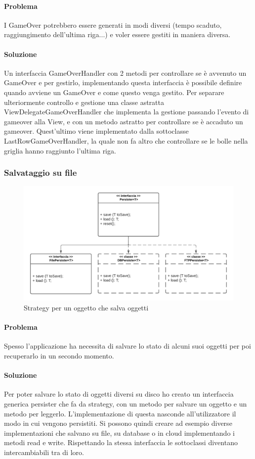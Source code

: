 \documentclass[a4paper,12pt]{report}
\begin{document}
\paragraph{Problema} I GameOver potrebbero essere generati in modi diversi (tempo scaduto, raggiungimento dell'ultima riga...) e voler essere gestiti in maniera diversa.

\paragraph{Soluzione} Un interfaccia GameOverHandler con 2 metodi per controllare se è avvenuto un GameOver e per gestirlo, implementando questa interfaccia è possibile definire quando avviene un GameOver
e come questo venga gestito. Per separare ulteriormente controllo e gestione una classe astratta ViewDelegateGameOverHandler che implementa la gestione passando l'evento di gameover alla View, e con un metodo
astratto per controllare se è accaduto un gameover. Quest'ultimo viene implementato dalla sottoclasse LastRowGameOverHandler, la quale non fa altro che controllare se le bolle nella griglia hanno raggiunto l'ultima
riga.

\subsubsection{Salvataggio su file}

\begin{figure}[H]
	\centering{}
	\includegraphics[width=.7\textwidth]{img/persister.pdf}
	\caption{Strategy per un oggetto che salva oggetti}
\end{figure}

\paragraph{Problema} Spesso l'applicazione ha necessita di salvare lo stato di alcuni suoi oggetti per poi recuperarlo in un secondo momento.

\paragraph{Soluzione} Per poter salvare lo stato di oggetti diversi su disco ho creato un interfaccia generica persister che fa da strategy, con un metodo per salvare un oggetto e un metodo per leggerlo.
L'implementazione di questa nasconde all'utilizzatore il modo in cui vengono persistiti. Si possono quindi creare ad esempio diverse implementazioni che salvano su file, su database o in cloud implementando i
metodi read e write. Rispettando la stessa interfaccia le sottoclassi diventano intercambiabili tra di loro.
\end{document}
